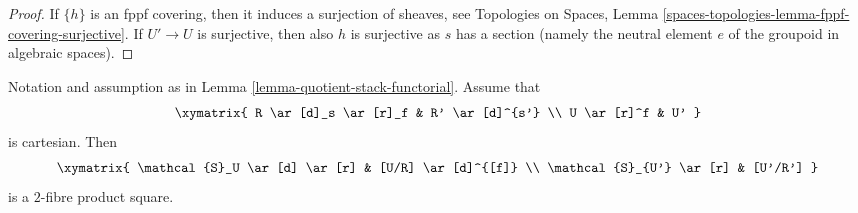 \begin{proof}
\medskip\noindent
If $\{h\}$ is an fppf covering, then it induces a surjection of sheaves, see
Topologies on Spaces,
Lemma \ref{spaces-topologies-lemma-fppf-covering-surjective}.
If $U' \to U$ is surjective, then also $h$ is surjective as $s$ has a section
(namely the neutral element $e$ of the groupoid in algebraic spaces).
\end{proof}

\begin{lemma}
\label{lemma-criterion-fibre-product}
Notation and assumption as in
Lemma \ref{lemma-quotient-stack-functorial}.
Assume that
$$
\xymatrix{
R \ar[d]_s \ar[r]_f & R' \ar[d]^{s'} \\
U \ar[r]^f & U'
}
$$
is cartesian. Then
$$
\xymatrix{
\mathcal{S}_U \ar[d] \ar[r] & [U/R] \ar[d]^{[f]} \\
\mathcal{S}_{U'} \ar[r] & [U'/R']
}
$$
is a $2$-fibre product square.
\end{lemma}

